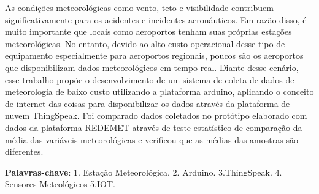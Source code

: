 
\setlength{\absparsep}{18pt} %
\begin{resumo}
As condições meteorológicas como vento, teto e visibilidade contribuem significativamente para os acidentes e incidentes aeronáuticos. Em razão disso, é muito importante que locais como aeroportos tenham suas próprias estações meteorológicas. No entanto, devido ao alto custo operacional desse tipo de equipamento especialmente para aeroportos regionais, poucos são os aeroportos que disponibilizam dados meteorológicos em tempo real. Diante desse cenário, esse trabalho propõe o desenvolvimento de um sistema de coleta de dados de meteorologia de baixo custo utilizando a plataforma arduino, aplicando o conceito de internet das coisas para disponibilizar os dados através da plataforma de nuvem ThingSpeak. Foi comparado dados coletados no protótipo elaborado com dados da plataforma REDEMET através de teste estatístico de comparação da média das variáveis meteorológicas e verificou que as médias das amostras são diferentes. 


 \vspace{\onelineskip}
 \noindent
 \textbf{Palavras-chave}: 1. Estação Meteorológica. 2. Arduino. 3.ThingSpeak. 4. Sensores Meteológicos 5.IOT.

\end{resumo}


